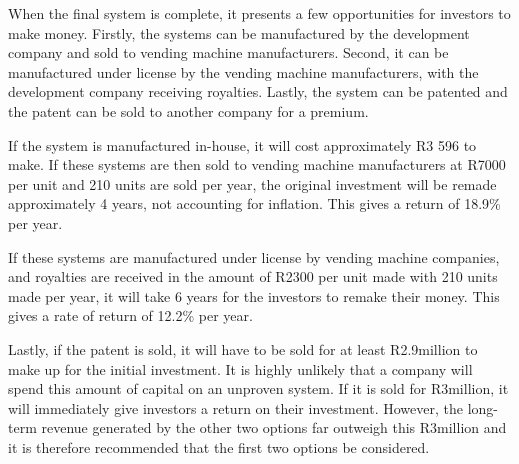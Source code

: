 When the final system is complete, it presents a few opportunities for investors to make
money. Firstly, the systems can be manufactured by the development company and sold to
vending machine manufacturers. Second, it can be manufactured under license by the vending machine
manufacturers, with the development company receiving royalties. Lastly, the system can be
patented and the patent can be sold to another company for a premium. 

If the system is manufactured in-house, it will cost approximately R3 596 to make. If
these systems are then sold to vending machine manufacturers at R7000 per unit and 210
units are sold per year, the original investment will be remade approximately 4 years,
not accounting for inflation. This gives a return of 18.9\% per year.

If these systems are manufactured under license by vending machine companies, and
royalties are received in the amount of R2300 per unit made with 210 units made per year,
it will take 6 years for the investors to remake their money. This gives a rate of return
of 12.2\% per year. 

Lastly, if the patent is sold, it will have to be sold for at least R2.9million to make up
for the initial investment. It is highly unlikely that a company will spend this amount of
capital on an unproven system. If it is sold for R3million, it will immediately give
investors a return on their investment. However, the long-term revenue generated by the
other two options far outweigh this R3million and it is therefore recommended that the
first two options be considered.
